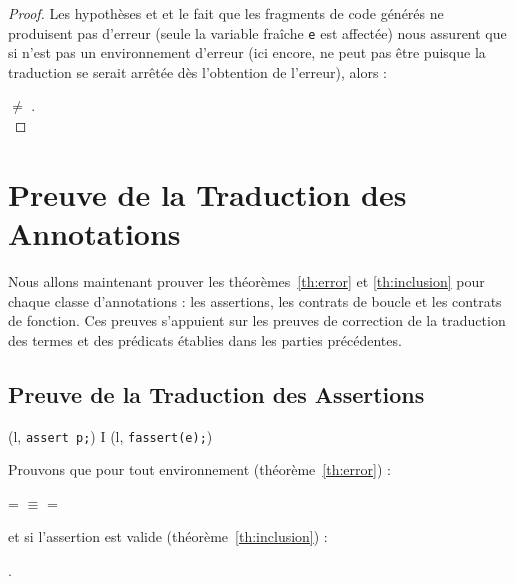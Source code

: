 \begin{proof}
  Les hypothèses  et  et le fait que les fragments de
  code générés ne produisent pas d'erreur (seule la variable fraîche
  \lstinline'e' est affectée) nous assurent que si \env n'est pas un
  environnement d'erreur (ici encore, \env ne peut pas être \errorenv puisque la
  traduction se serait arrêtée dès l'obtention de l'erreur), alors :

   $\neq$ \errorenv.
  ~\\
\end{proof}





\section{Preuve de la Traduction des Annotations}
\label{sec:annotation-translation}


Nous allons maintenant prouver les théorèmes~\ref{th:error} et
\ref{th:inclusion} pour chaque classe d'annotations : les assertions, les
contrats de boucle et les contrats de fonction.
Ces preuves s'appuient sur les preuves de correction de la traduction des termes
et des prédicats établies dans les parties précédentes.


\subsection{Preuve de la Traduction des Assertions}


{
  {(l, \mbox{\lstinline'assert p;'})
     I \concat (l, \mbox{\lstinline'fassert(e);'})}
}


Prouvons que pour tout environnement \env (théorème~\ref{th:error}) :

 = \errorenv
$\equiv$ 
= \errorenv

et si l'assertion est valide (théorème~\ref{th:inclusion}) :

\env \subenv {}.



